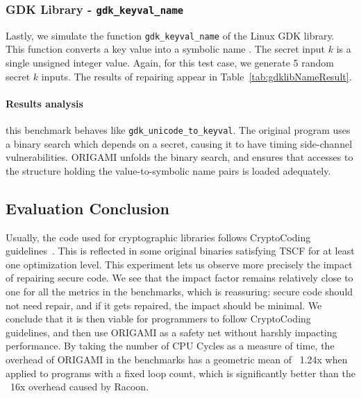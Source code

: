 {\subsubsection{GDK Library - \texttt{gdk\_keyval\_name}}
Lastly, we simulate the function \texttt{gdk\_keyval\_name} of the Linux GDK library. This function converts a key value into a symbolic name \cite{gdklib}. The secret input $k$ is a single unsigned integer value. 
Again, for this test case, we generate 5 random secret $k$ inputs. The results of repairing appear in Table~\ref{tab:gdklibNameResult}. 

\paragraph*{Results analysis} this benchmark behaves like \texttt{gdk\_unicode\_to\_keyval}. 
The original program uses a binary search which depends on a secret, causing it to have timing side-channel vulnerabilities. ORIGAMI unfolds the binary search, and ensures that accesses to the structure holding the value-to-symbolic name pairs is loaded adequately. 

\subsection{Evaluation Conclusion} %

Usually, the code used for cryptographic libraries follows CryptoCoding guidelines~\cite{CryptoCoding}. This is reflected in some original binaries satisfying TSCF for at least one optimization level. This experiment lets us observe more precisely the impact of repairing secure code. We see that the impact factor remains relatively close to one for all the metrics in the benchmarks, which is reassuring: secure code should not need repair, and if it gets repaired, the impact should be minimal. We conclude that it is then viable for programmers to follow CryptoCoding guidelines, and then use ORIGAMI as a safety net without harshly impacting performance. By taking the number of CPU Cycles as a measure of time, the overhead of ORIGAMI in the benchmarks has a geometric mean of ~1.24x when applied to programs with a fixed loop count, which is significantly better than the ~16x overhead caused by Racoon. 

}
